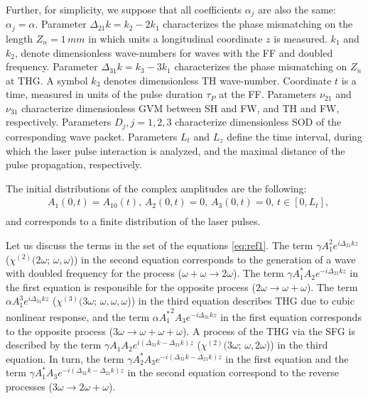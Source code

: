 \documentclass[a4paper, 12pt, onecolumn]{extarticle}
\begin{document}
Further, for simplicity, we suppose that all coefficients \(\alpha_j\) are also the same: \(\alpha_j=\alpha\). Parameter \(\Delta_{21} k=k_2 - 2k_1\)  characterizes the phase mismatching on the length $Z_n=1\,mm$ in which units a longitudinal coordinate $z$ is measured. \(k_1\) and \(k_2\), denote dimensionless wave-numbers for waves with the FF and doubled frequency. Parameter \(\Delta_{31} k=k_3 - 3k_1\) characterizes the phase mismatching on $Z_n$ at THG. A symbol \(k_3\) denotes dimensionless TH wave-number. Coordinate \(t\) is a time, measured in units of the pulse duration \(\tau_P\) at the FF. Parameters \(\nu_{21}\) and \(\nu_{31}\) characterize dimensionless GVM between SH and FW, and TH and FW, respectively. Parameters \(D_{j}, j=1,2,3\) characterize dimensionless SOD of the corresponding wave packet. Parameters \(L_t\) and \(L_z\) define the time interval, during which the laser pulse interaction is analyzed, and the maximal distance of the pulse propagation, respectively.

The initial distributions of the complex amplitudes are the following:
\begin{equation}\begin{aligned}
\label{eq:first}
&A_1(0,t)=A_{10}(t),\, A_2(0,t)=0,\,A_3(0,t)=0,\, t\in[0,L_t],\\
\end{aligned}\end{equation}
and corresponds to a finite distribution of the laser pulses.

Let us discuss the terms in the set of the equations \eqref{eq:ref1}. The term \(\gamma A_1^2e^{i\Delta_{21} kz}\) (\(\chi^{(2)}(2\omega;\,\omega,\omega\))) in the second equation corresponds to the generation of a wave with doubled frequency for the process (\(\omega+\omega\rightarrow2\omega\)). The term \(\gamma  A_1^* A_2e^{-i\Delta_{21} kz}\) in the first equation is responsible for the opposite process (\(2\omega \rightarrow \omega+\omega\)). The term \(\alpha A_1^3e^{i\Delta_{31}kz}\) (\(\chi^{(3)}(3\omega;\,\omega,\omega,\omega\))) in the third equation describes THG due to cubic nonlinear response, and the term \(\alpha {A_1^*}^2 A_3 e^{-i\Delta_{31}kz}\) in the first equation corresponds to the opposite process (\(3\omega\rightarrow\omega+\omega+\omega\)). A process of the THG via the SFG is described by the term \(\gamma A_1 A_2e^{i(\Delta_{31}k-\Delta_{21}k)z}\) (\(\chi^{(2)}(3\omega;\,\omega,2\omega\))) in the third equation. In turn, the term \(\gamma A_2^* A_3e^{-i(\Delta_{31}k-\Delta_{21}k)z}\) in the first equation and the term \(\gamma A_1^* A_3e^{-i(\Delta_{31}k-\Delta_{21}k)z}\) in the second equation correspond to the reverse processes (\(3\omega\rightarrow2\omega+\omega\)). 
\end{document}
